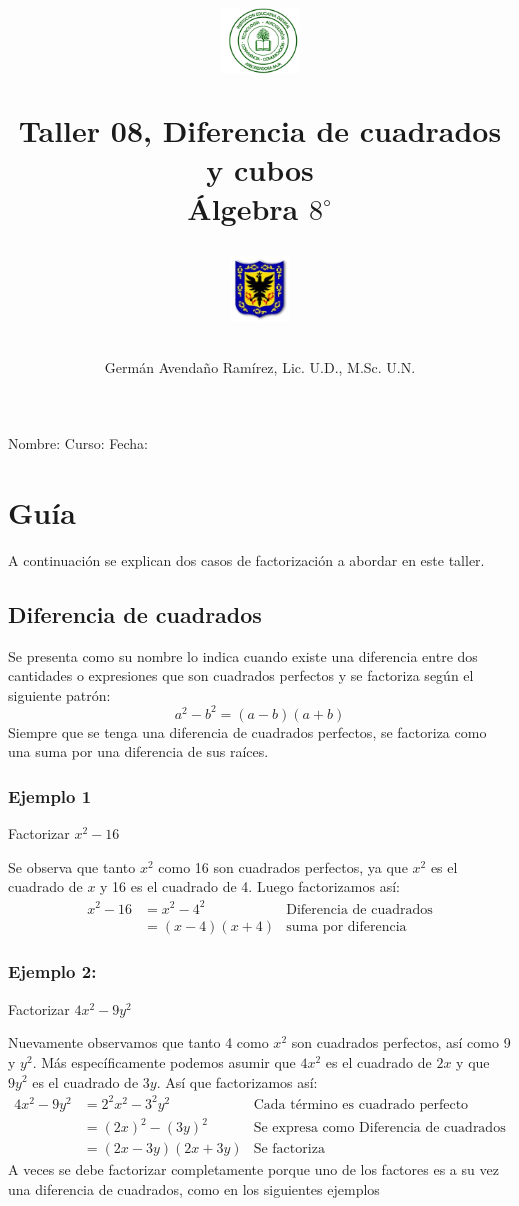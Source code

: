 \documentclass[10pt,twoside]{article}
\author{Germ\'an Avenda\~no Ram\'irez, Lic. U.D., M.Sc. U.N.}
\title{\begin{minipage}{.2\textwidth}
\includegraphics[height=1.75cm]{Images/logo-colegio.png}\end{minipage}
\begin{minipage}{.55\textwidth}
\begin{center}
Taller 08, Diferencia de cuadrados y cubos\\
Álgebra $8^{\circ}$
\end{center}
\end{minipage}\hfill
\begin{minipage}{.2\textwidth}
\includegraphics[height=1.75cm]{Images/logo-sed.png} 
\end{minipage}}
\date{}
\begin{document}
\maketitle
Nombre: \hrulefill Curso: \underline{\hspace*{44pt}} Fecha: \underline{\hspace*{2.5cm}}
\section*{Gu\'{i}a}
A continuaci\'{o}n se explican dos casos de factorizaci\'{o}n a abordar en este taller.
\subsection*{Diferencia de cuadrados}
Se presenta como su nombre lo indica cuando existe una diferencia entre dos cantidades o expresiones que son cuadrados perfectos y se factoriza seg\'{u}n el siguiente patr\'{o}n:
\[a^{2}-b^{2}=(a-b)(a+b)\]
Siempre que se tenga una diferencia de cuadrados perfectos, se factoriza como una suma por una diferencia de sus ra\'{i}ces.
\subsubsection*{Ejemplo 1}
Factorizar $x^{2}-16$

Se observa que tanto $x^{2}$ como 16 son cuadrados perfectos, ya que $x^{2}$ es el cuadrado de $x$ y 16 es el cuadrado de 4. Luego factorizamos as\'{i}:
\begin{align*}
x^{2}-16&=x^{2}-4^{2} & \mbox{Diferencia de cuadrados}\\
&=(x-4)(x+4) & \mbox{suma por diferencia}
\end{align*}
\subsubsection*{Ejemplo 2:}
Factorizar $4x^{2}-9y^{2}$

Nuevamente observamos que tanto 4 como $x^{2}$ son cuadrados perfectos, as\'{i} como 9 y $y^{2}$. M\'{a}s espec\'{i}ficamente podemos asumir que $4x^{2}$ es el cuadrado de $2x$ y que $9y^{2}$ es el cuadrado de $3y$. As\'{i} que factorizamos as\'{i}:
\begin{align*}
4x^{2}-9y^{2}&=2^{2}x^{2}-3^{2}y^{2} & \mbox{Cada término es cuadrado perfecto}\\
&=(2x)^{2}-(3y)^{2}& \mbox{Se expresa como Diferencia de cuadrados}\\
&=(2x-3y)(2x+3y) & \mbox{Se factoriza}
\end{align*}
A veces se debe factorizar completamente porque uno de los factores es a su vez una diferencia de cuadrados, como en los siguientes ejemplos
\end{document}
